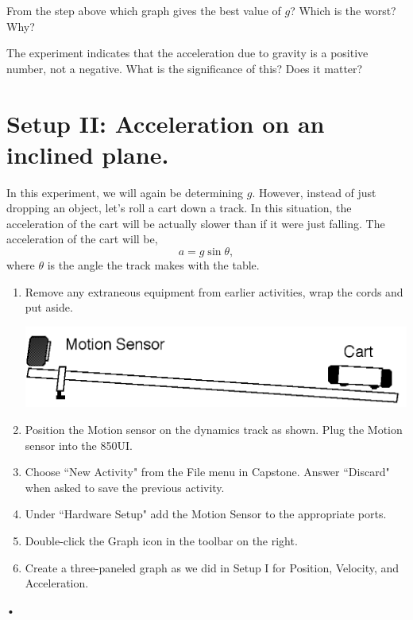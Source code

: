\documentclass[main.tex]{subfiles}
\begin{document}
\begin{question}
From the step above which graph gives the best value of $g$? Which is the worst? Why?
\end{question}
\begin{question}
The experiment indicates that the acceleration due to gravity is a positive number, not a negative. What is the significance of this? Does it matter?
\end{question}

\section{Setup II: Acceleration on an inclined plane.}
In this experiment, we will again be determining $g.$ However, instead of just dropping an object, let's roll a cart down a track. In this situation, the acceleration of the cart will be actually slower than if it were just falling. The acceleration of the cart will be,
\begin{equation}\label{eq:AsinG}
a=g\sin{\theta},
\end{equation}
where $\theta$ is the angle the track makes with the table. 

\begin{enumerate}
\item
Remove any extraneous equipment from earlier activities, wrap the cords and put aside.

\includegraphics[width=\textwidth]{Accel_2_Setup}
\item
Position the Motion sensor on the dynamics track as shown. Plug the Motion sensor into the 850UI.
\item
Choose ``New Activity" from the File menu in Capstone. Answer ``Discard" when asked to save the previous activity.
\item
Under ``Hardware Setup" add the Motion Sensor to the appropriate ports.
\item
Double-click the Graph icon in the toolbar on the right.
\item
Create a three-paneled graph as we did in Setup I for Position, Velocity, and Acceleration. 
\end{enumerate}•
\end{document}
